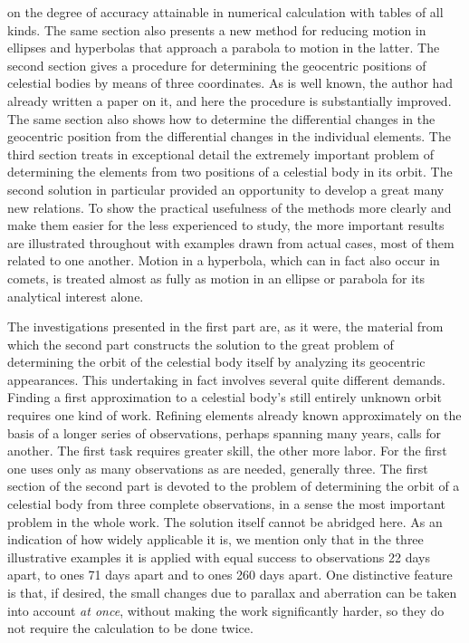 on the degree of accuracy attainable in numerical calculation with tables of all kinds. The same section also presents a new method for reducing motion in ellipses and hyperbolas that approach a parabola to motion in the latter. The second section gives a procedure for determining the geocentric positions of celestial bodies by means of three coordinates. As is well known, the author had already written a paper on it, and here the procedure is substantially improved. The same section also shows how to determine the differential changes in the geocentric position from the differential changes in the individual elements. The third section treats in exceptional detail the extremely important problem of determining the elements from two positions of a celestial body in its orbit. The second solution in particular provided an opportunity to develop a great many new relations. To show the practical usefulness of the methods more clearly and make them easier for the less experienced to study, the more important results are illustrated throughout with examples drawn from actual cases, most of them related to one another. Motion in a hyperbola, which can in fact also occur in comets, is treated almost as fully as motion in an ellipse or parabola for its analytical interest alone.

The investigations presented in the first part are, as it were, the material from which the second part constructs the solution to the great problem of determining the orbit of the celestial body itself by analyzing its geocentric appearances. This undertaking in fact involves several quite different demands. Finding a first approximation to a celestial body’s still entirely unknown orbit requires one kind of work. Refining elements already known approximately on the basis of a longer series of observations, perhaps spanning many years, calls for another. The first task requires greater skill, the other more labor. For the first one uses only as many observations as are needed, generally three. The first section of the second part is devoted to the problem of determining the orbit of a celestial body from three complete observations, in a sense the most important problem
in the whole work. The solution itself cannot be abridged here. As an indication of how widely applicable it is, we mention only that in the three illustrative examples it is applied with equal success to observations 22 days apart, to ones 71 days apart and to ones 260 days apart. One distinctive feature is that, if desired, the small changes due to parallax and aberration can be taken into account \textit{at once}, without making the work significantly harder, so they do not require the calculation to be done twice.

